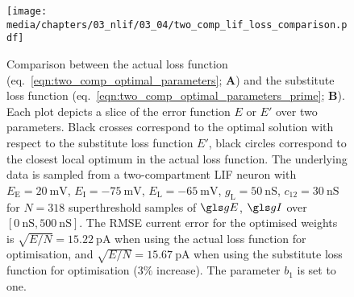 \begin{figure}
	\centering
	\texttt{[image: media/chapters/03\_nlif/03\_04/two\_comp\_lif\_loss\_comparison.pdf]}
	\caption[Comparison between the actual and substitute loss function.]{Comparison between the actual loss function (eq.~\ref{eqn:two_comp_optimal_parameters}; \textbf{A}) and the substitute loss function (eq.~\ref{eqn:two_comp_optimal_parameters_prime}; \textbf{B}).
	Each plot depicts a slice of the error function $E$ or $E'$ over two parameters.
	Black crosses correspond to the optimal solution with respect to the substitute loss function $E'$, black circles correspond to the closest local optimum in the actual loss function.
	The underlying data is sampled from a two-compartment LIF neuron with  $E_\mathrm{E} = \SI{20}{\milli\volt}$, $E_\mathrm{I} = \SI{-75}{\milli\volt}$, $E_\mathrm{L} = \SI{-65}{\milli\volt}$, $g_\mathrm{L} = \SI{50}{\nano\siemens}$, $c_{12} =\SI{30}{\nano\siemens}$ for $N = 318$ superthreshold samples of $\gE$, $\gI$ over $[\SI{0}{\nano\siemens}, \SI{500}{\nano\siemens}]$.
	The RMSE current error for the optimised weights is $\sqrt{E/N} = \SI{15.22}{\pico\ampere}$ when using the actual loss function for optimisation, and $\sqrt{E/N} = \SI{15.67}{\pico\ampere}$ when using the substitute loss function for optimisation ($3\%$ increase). The parameter $b_1$ is set to one.
	}
	\label{fig:two_comp_lif_loss_comparison}
\end{figure}

